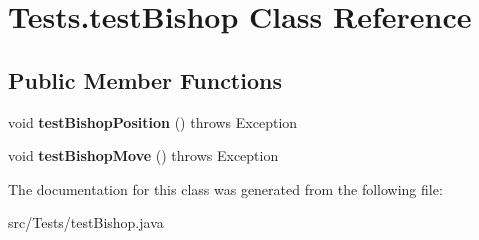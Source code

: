 \hypertarget{class_tests_1_1test_bishop}{}\section{Tests.\+test\+Bishop Class Reference}
\label{class_tests_1_1test_bishop}
\subsection*{Public Member Functions}
\begin{DoxyCompactItemize}
\item 
\mbox{\label{class_tests_1_1test_bishop_a00afd1a97ca4a83ce359504d1ffd5871}} 
void {\bfseries test\+Bishop\+Position} ()  throws Exception
\item 
\mbox{\label{class_tests_1_1test_bishop_a2caa9a47ad66c8f79d4e01015791582c}} 
void {\bfseries test\+Bishop\+Move} ()  throws Exception
\end{DoxyCompactItemize}


The documentation for this class was generated from the following file\+:\begin{DoxyCompactItemize}
\item 
src/\+Tests/test\+Bishop.\+java\end{DoxyCompactItemize}
